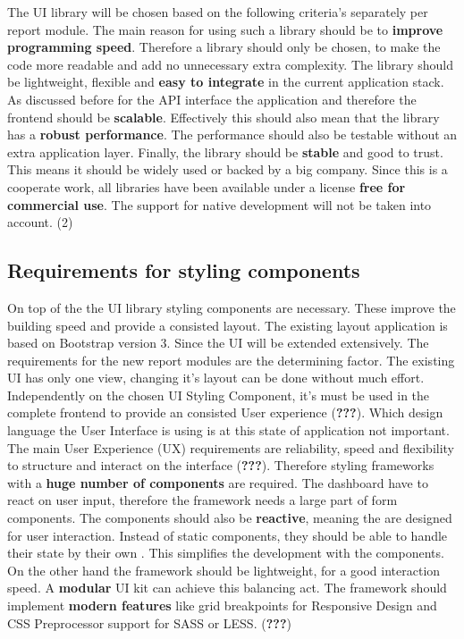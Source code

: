 \documentclass[american,a4paper,oneside,,tablecaptionabove]{scrbook}
\begin{document}
The UI library will be chosen based on the following criteria's
separately per report module. The main reason for using such a library
should be to \textbf{improve programming speed}. Therefore a library
should only be chosen, to make the code more readable and add no
unnecessary extra complexity. The library should be lightweight,
flexible and \textbf{easy to integrate} in the current application
stack. As discussed before for the API interface the application and
therefore the frontend should be \textbf{scalable}. Effectively this
should also mean that the library has a \textbf{robust performance}. The
performance should also be testable without an extra application layer.
Finally, the library should be \textbf{stable} and good to trust. This
means it should be widely used or backed by a big company. Since this is
a cooperate work, all libraries have been available under a license
\textbf{free for commercial use}. The support for native development
will not be taken into account. (2)

\subsection{Requirements for styling
components}\label{requirements-for-styling-components}

On top of the the UI library styling components are necessary. These
improve the building speed and provide a consisted layout. The existing
layout application is based on Bootstrap version 3. Since the UI will be
extended extensively. The requirements for the new report modules are
the determining factor. The existing UI has only one view, changing it's
layout can be done without much effort. Independently on the chosen UI
Styling Component, it's must be used in the complete frontend to provide
an consisted User experience ({\textbf{???}}). Which design language the
User Interface is using is at this state of application not important.
The main User Experience (UX) requirements are reliability, speed and
flexibility to structure and interact on the interface ({\textbf{???}}).
Therefore styling frameworks with a \textbf{huge number of components}
are required. The dashboard have to react on user input, therefore the
framework needs a large part of form components. The components should
also be \textbf{reactive}, meaning the are designed for user
interaction. Instead of static components, they should be able to handle
their state by their own . This simplifies the development with the
components. On the other hand the framework should be lightweight, for a
good interaction speed. A \textbf{modular} UI kit can achieve this
balancing act. The framework should implement \textbf{modern features}
like grid breakpoints for Responsive Design and CSS Preprocessor support
for SASS or LESS. ({\textbf{???}})
\end{document}
